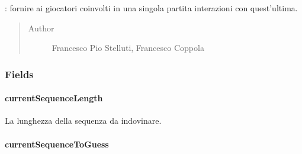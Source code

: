 \documentclass[letterpaper,10pt,italian,openany,oneside]{sphinxmanual}
\begin{document}
\begin{fulllineitems}
\label{\detokenize{source/it/unicam/cs/pa/mastermind/ui/InteractionView:it.unicam.cs.pa.mastermind.ui.InteractionView}}
: fornire ai giocatori coinvolti in una singola partita interazioni con quest’ultima.
\begin{quote}\begin{description}
\item[{Author}] \leavevmode
Francesco Pio Stelluti, Francesco Coppola

\end{description}\end{quote}

\end{fulllineitems}



\subsubsection{Fields}
\label{\detokenize{source/it/unicam/cs/pa/mastermind/ui/InteractionView:fields}}

\paragraph{currentSequenceLength}
\label{\detokenize{source/it/unicam/cs/pa/mastermind/ui/InteractionView:currentsequencelength}}

\begin{fulllineitems}
\label{\detokenize{source/it/unicam/cs/pa/mastermind/ui/InteractionView:it.unicam.cs.pa.mastermind.ui.InteractionView.currentSequenceLength}}
La lunghezza della sequenza da indovinare.

\end{fulllineitems}



\paragraph{currentSequenceToGuess}
\label{\detokenize{source/it/unicam/cs/pa/mastermind/ui/InteractionView:currentsequencetoguess}}
\end{document}
